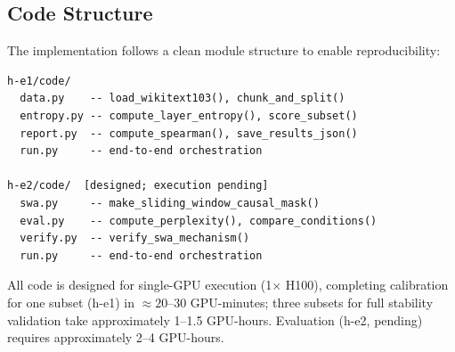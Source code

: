 \subsection{Code Structure}

The implementation follows a clean module structure to enable reproducibility:

\begin{verbatim}
h-e1/code/
  data.py    -- load_wikitext103(), chunk_and_split()
  entropy.py -- compute_layer_entropy(), score_subset()
  report.py  -- compute_spearman(), save_results_json()
  run.py     -- end-to-end orchestration

h-e2/code/  [designed; execution pending]
  swa.py     -- make_sliding_window_causal_mask()
  eval.py    -- compute_perplexity(), compare_conditions()
  verify.py  -- verify_swa_mechanism()
  run.py     -- end-to-end orchestration
\end{verbatim}

All code is designed for single-GPU execution (1$\times$ H100), completing calibration for one subset (h-e1) in $\approx 20$--30 GPU-minutes; three subsets for full stability validation take approximately 1--1.5 GPU-hours. Evaluation (h-e2, pending) requires approximately 2--4 GPU-hours.
